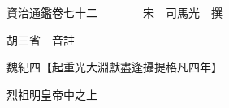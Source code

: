 










 


 
 


 

  
  
  
  
  





  
  
  
  
  
 
  

  

  
  
  



  

 
 

  
   




  

  
  


  　　資治通鑑卷七十二　　　　宋　司馬光　撰

　　胡三省　音註

　　魏紀四【起重光大淵獻盡逢攝提格凡四年】

　　烈祖明皇帝中之上

